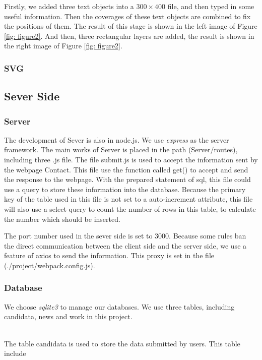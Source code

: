 \documentclass{article}
\begin{document}
\noindent
Firstly, we added three text objects into a $ 300 \times 400 $ file, and then 
typed in some useful information. Then the coverages of these text objects are
combined to fix the positions of them. The result of this stage is shown in the 
left image of Figure \ref{fig: figure2}. And then, three rectangular layers are 
added, the result is shown in the right image of Figure \ref{fig: figure2}. 



\subsubsection{SVG}

\subsection{Sever Side}
\subsubsection{Server}
The development of Sever is also in node.js. We use \textit{express} as the 
server framework. The main works of Server is placed in the path (Server/routes),
including three .js file. The file submit.js is used to accept the information 
sent by the webpage Contact. This file use the function called get() to accept and 
send the response to the webpage. With the prepared statement of sql, this file 
could use a query to store these information into the database. Because the primary
key of the table used in this file is not set to a auto-increment attribute, this
file will also use a select query to count the number of rows in this table, to 
calculate the number which should be inserted.

The port number used in the sever side is set to 3000. Because some rules ban the 
direct communication between the client side and the server side, we use a feature
of axios to send the information. This proxy is set in the file (./project/webpack.config.js).
\subsubsection{Database}
We choose \textit{sqlite3} to manage our databases. 
We use three tables, including candidata, news and work in this project.

~\\
\noindent
The table candidata is used to store the data submitted by users. This table
include 
\end{document}
